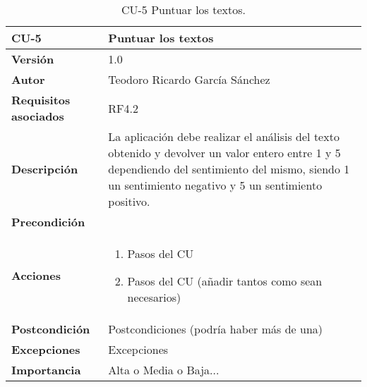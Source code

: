 \begin{table}[p]
	\centering
	\begin{tabularx}{\linewidth}{ p{} p{} }
		\toprule
		\textbf{CU-5}    & \textbf{Puntuar los textos}\\
		\toprule
		\textbf{Versión}              & 1.0    \\
		\textbf{Autor}                & Teodoro Ricardo García Sánchez \\
		\textbf{Requisitos asociados} & RF4.2 \\
		\textbf{Descripción}          & La aplicación debe realizar el análisis del texto obtenido
										 y devolver un valor entero entre 1 y 5 dependiendo del sentimiento del mismo, siendo 1 un sentimiento negativo y 5 un sentimiento positivo. \\
		\textbf{Precondición}         &  \\
		\textbf{Acciones}             &
		\begin{enumerate}
			\def\labelenumi{\arabic{enumi}.}
			\tightlist
			\item Pasos del CU
			\item Pasos del CU (añadir tantos como sean necesarios)
		\end{enumerate}\\
		\textbf{Postcondición}        & Postcondiciones (podría haber más de una) \\
		\textbf{Excepciones}          & Excepciones \\
		\textbf{Importancia}          & Alta o Media o Baja... \\
		\bottomrule
	\end{tabularx}
	\caption{CU-5 Puntuar los textos.}
\end{table}
